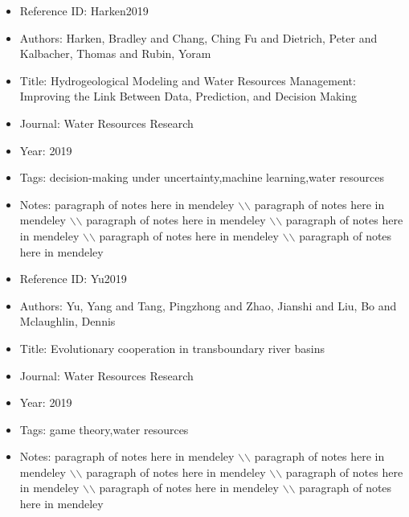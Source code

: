 \documentclass[11pt]{article}
\begin{document}
\noindent\citep{Harken2019} 
\begin{itemize} 
\item{Reference ID:  Harken2019} 

\item{Authors:  Harken, Bradley and Chang, Ching Fu and Dietrich, Peter and Kalbacher, Thomas and Rubin, Yoram} 

\item{Title:  Hydrogeological Modeling and Water Resources Management: Improving the Link Between Data, Prediction, and Decision Making} 

\item{Journal:  Water Resources Research} 

\item{Year:  2019} 

\item{Tags:  decision-making under uncertainty,machine learning,water resources} 

\item{Notes:  paragraph of notes here in mendeley $\backslash$$\backslash$ paragraph of notes here in mendeley $\backslash$$\backslash$ paragraph of notes here in mendeley $\backslash$$\backslash$ paragraph of notes here in mendeley $\backslash$$\backslash$ paragraph of notes here in mendeley $\backslash$$\backslash$ paragraph of notes here in mendeley} 

\end{itemize}\medskip



\noindent\citep{Yu2019} 
\begin{itemize} 
\item{Reference ID:  Yu2019} 

\item{Authors:  Yu, Yang and Tang, Pingzhong and Zhao, Jianshi and Liu, Bo and Mclaughlin, Dennis} 

\item{Title:  Evolutionary cooperation in transboundary river basins} 

\item{Journal:  Water Resources Research} 

\item{Year:  2019} 

\item{Tags:  game theory,water resources} 

\item{Notes:  paragraph of notes here in mendeley $\backslash$$\backslash$ paragraph of notes here in mendeley $\backslash$$\backslash$ paragraph of notes here in mendeley $\backslash$$\backslash$ paragraph of notes here in mendeley $\backslash$$\backslash$ paragraph of notes here in mendeley $\backslash$$\backslash$ paragraph of notes here in mendeley} 

\end{itemize}\medskip
\end{document}
